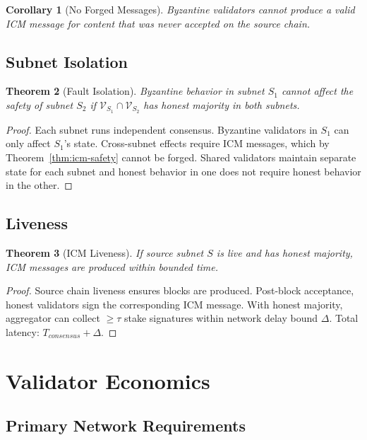 \documentclass[11pt,a4paper]{article}
\newtheorem{theorem}{Theorem}
\newtheorem{corollary}[theorem]{Corollary}
\begin{document}
\begin{corollary}[No Forged Messages]
Byzantine validators cannot produce a valid ICM message for content that was never accepted on the source chain.
\end{corollary}

\subsection{Subnet Isolation}

\begin{theorem}[Fault Isolation]
Byzantine behavior in subnet $S_1$ cannot affect the safety of subnet $S_2$ if $\mathcal{V}_{S_1} \cap \mathcal{V}_{S_2}$ has honest majority in both subnets.
\end{theorem}

\begin{proof}
Each subnet runs independent consensus. Byzantine validators in $S_1$ can only affect $S_1$'s state. Cross-subnet effects require ICM messages, which by Theorem~\ref{thm:icm-safety} cannot be forged. Shared validators maintain separate state for each subnet and honest behavior in one does not require honest behavior in the other.
\end{proof}

\subsection{Liveness}

\begin{theorem}[ICM Liveness]
If source subnet $S$ is live and has honest majority, ICM messages are produced within bounded time.
\end{theorem}

\begin{proof}
Source chain liveness ensures blocks are produced. Post-block acceptance, honest validators sign the corresponding ICM message. With honest majority, aggregator can collect $\geq \tau$ stake signatures within network delay bound $\Delta$. Total latency: $T_{consensus} + \Delta$.
\end{proof}

\section{Validator Economics}

\subsection{Primary Network Requirements}
\end{document}
